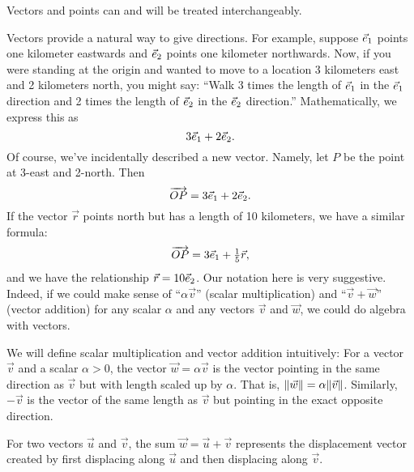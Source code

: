 \begin{emphbox}[Takeaway]
	Vectors and points can and will be treated interchangeably.
\end{emphbox}


Vectors provide a natural way to give directions.
For example, suppose ${\vec e_1}$ points one kilometer eastwards and ${\vec e_2}$
points one kilometer northwards.  Now, if you were standing at the origin
and wanted to move to a location 3 kilometers east and 2 kilometers north, you might say:
``Walk 3 times the length of ${\vec e_1}$  in the ${\vec e_1}$ direction and 2 times
the length of ${\vec e_2}$ in the ${\vec e_2}$ direction.''  Mathematically, we express this
as
\[
	3{\vec e_1}+2{\vec e_2}.
\]
Of course, we've incidentally described a new vector.  Namely, let $P$
be the point at 3-east and 2-north.  Then
\[
	\overrightarrow{OP}=3{\vec e_1}+2{\vec e_2}.
\]
If the vector $\vec r$ points north but has a length of 10 kilometers, we have
a similar formula:
\[
	\overrightarrow{OP}=3{\vec e_1}+\tfrac{1}{5}\vec r,
\]
and we have the relationship $\vec r=10{\vec e_2}$.
Our notation here is very suggestive.  Indeed, if we could make
sense of ``$\alpha\vec v$'' (scalar multiplication) and ``$\vec v+\vec w$'' (vector addition)
for any scalar $\alpha$ and any vectors
$\vec v$ and $\vec w$, we could
do algebra with vectors.

We will define scalar multiplication and vector addition intuitively:
For a vector $\vec v$ and a scalar $\alpha>0$, the
vector $\vec w=\alpha\vec v$ is the vector pointing in the same direction as
$\vec v$ but with length scaled up by $\alpha$.  That is, $\lVert\vec w\rVert=\alpha\lVert\vec v\rVert$.
Similarly, $-\vec v$ is the vector of the same length as $\vec v$ but
pointing in the exact opposite direction.

\begin{center}
	\usetikzlibrary{patterns,decorations.pathreplacing}
\end{center}

For two vectors $\vec u$ and $\vec v$, the sum $\vec w=\vec u+\vec v$ represents
the displacement vector created by first displacing along $\vec u$
and then displacing along $\vec v$.

